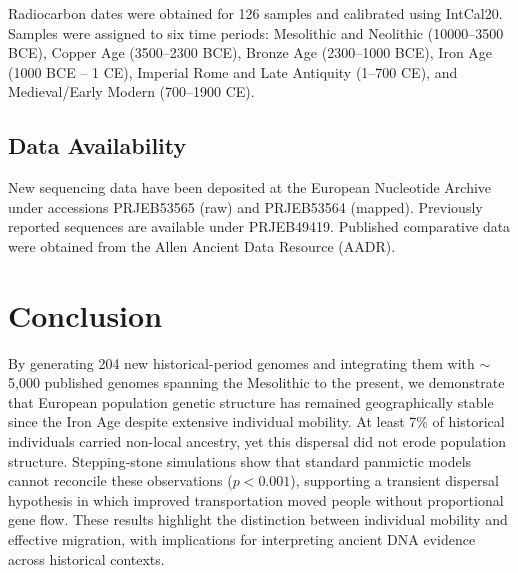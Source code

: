 \documentclass[11pt]{article}
\begin{document}
Radiocarbon dates were obtained for 126 samples and calibrated using IntCal20. Samples were assigned to six time periods: Mesolithic and Neolithic (10000--3500 BCE), Copper Age (3500--2300 BCE), Bronze Age (2300--1000 BCE), Iron Age (1000 BCE -- 1 CE), Imperial Rome and Late Antiquity (1--700 CE), and Medieval/Early Modern (700--1900 CE).

\subsection{Data Availability}

New sequencing data have been deposited at the European Nucleotide Archive under accessions PRJEB53565 (raw) and PRJEB53564 (mapped). Previously reported sequences are available under PRJEB49419. Published comparative data were obtained from the Allen Ancient Data Resource (AADR).

\section{Conclusion}

By generating 204 new historical-period genomes and integrating them with $\sim$5,000 published genomes spanning the Mesolithic to the present, we demonstrate that European population genetic structure has remained geographically stable since the Iron Age despite extensive individual mobility. At least 7\% of historical individuals carried non-local ancestry, yet this dispersal did not erode population structure. Stepping-stone simulations show that standard panmictic models cannot reconcile these observations ($p < 0.001$), supporting a transient dispersal hypothesis in which improved transportation moved people without proportional gene flow. These results highlight the distinction between individual mobility and effective migration, with implications for interpreting ancient DNA evidence across historical contexts.



\end{document}
